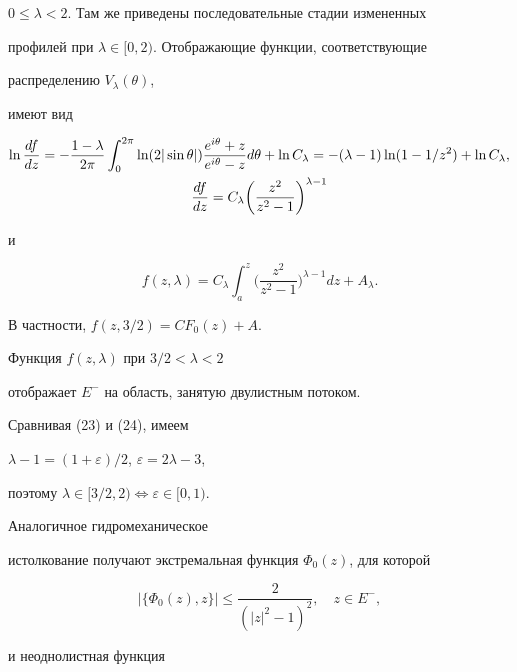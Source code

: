 $0\le\lambda<2$. Там же приведены последовательные стадии измененных 


профилей при $\lambda\in[0,2)$. Отображающие функции, соответствующие 


распределению $V_\lambda(\theta)$, 


имеют вид 


\begin{gather} 


\ln\frac{df}{dz}=-\frac{1-\lambda}{2\pi}\int^{2\pi}_0 


\ln(2|\sin\theta|)\frac{e^{i\theta}+z}{e^{i\theta}-z}d\theta+ 


\ln C_\lambda=-(\lambda-1)\ln(1-1/z^2)+\ln C_\lambda, 


\notag\\ 


\frac{df}{dz}=C_\lambda\bigg(\frac{z^2}{z^2-1} 


\bigg)^{\lambda-1} 


\end{gather} 


и 


$$ 


f(z,\lambda)=C_\lambda\int^z_a\bigg( 


\frac{z^2}{z^2-1}\bigg)^{\lambda-1}dz+A_\lambda. 


$$ 


В частности, $f(z,3/2)=C F_0(z)+A$. 


Функция $f(z,\lambda)$ при $3/2<\lambda<2$ 


отображает $E^-$ на область, занятую двулистным потоком. 


Сравнивая (23) и (24), имеем 


$\lambda-1=(1+\varepsilon)/2$, $\varepsilon=2\lambda-3$, 


поэтому $\lambda\in[3/2,2)\Longleftrightarrow\varepsilon\in[0,1)$. 


 


Аналогичное гидромеханическое 


истолкование получают экстремальная функция $\Phi_0(z)$, для которой 


\begin{equation} 


|\{\Phi_0(z),z\}|\le\frac{2}{(|z|^2-1)^2},\quad 


z\in E^-, 


\end{equation} 


и неоднолистная функция 


